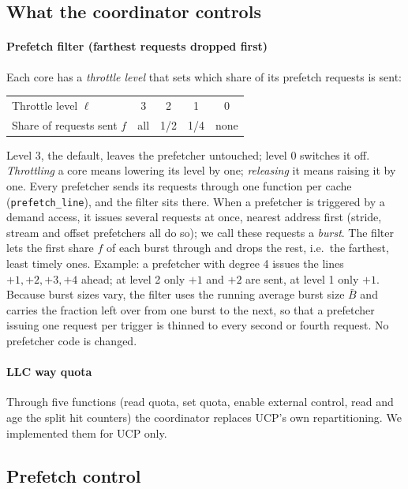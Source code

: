 \subsection{What the coordinator controls}
\label{sec:knobs}
\paragraph{Prefetch filter (farthest requests dropped first)}
Each core has a \emph{throttle level} that sets which share of its prefetch requests is sent:
\begin{center}\footnotesize
\begin{tabular}{lcccc}
\toprule
Throttle level $\ell$ & 3 & 2 & 1 & 0 \\
Share of requests sent $f$ & all & 1/2 & 1/4 & none \\
\bottomrule
\end{tabular}
\end{center}
Level 3, the default, leaves the prefetcher untouched; level 0 switches it off.  \emph{Throttling} a core means lowering its level by one; \emph{releasing} it means raising it by one.  Every
prefetcher sends its requests through one function per cache (\texttt{prefetch\_line}), and the filter sits there.
When a prefetcher is triggered by a demand access, it issues several requests at once, nearest address first (stride,
stream and offset prefetchers all do so); we call these requests a \emph{burst}.  The filter lets the first
share $f$ of each burst through and drops the rest, i.e.\ the farthest, least timely ones.  Example: a prefetcher with
degree 4 issues the lines $+1,+2,+3,+4$ ahead; at level 2 only $+1$ and $+2$ are sent, at level 1 only $+1$.  Because
burst sizes vary, the filter uses the running average burst size $\bar B$ and carries the fraction left over from one
burst to the next, so that a prefetcher issuing one request per trigger is thinned to every second or fourth request.
No prefetcher code is changed.
\paragraph{LLC way quota}
Through five functions (read quota, set quota, enable external control, read and age the split hit counters) the
coordinator replaces UCP's own repartitioning.  We implemented them for UCP only.

\subsection{Prefetch control}

